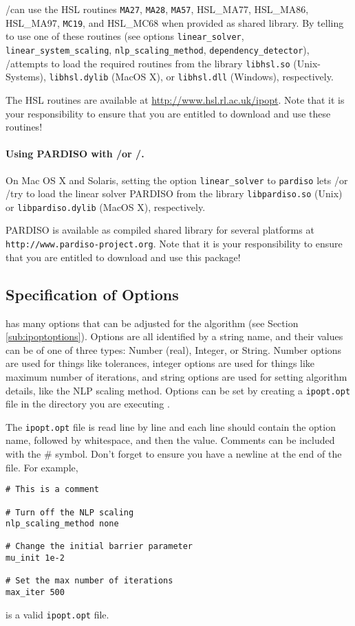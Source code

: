 \GAMS/\IPOPT can use the HSL routines \texttt{MA27}, \texttt{MA28}, \texttt{MA57}, \textsc{HSL\_MA77}, \textsc{HSL\_MA86}, \textsc{HSL\_MA97}, \texttt{MC19}, and \textsc{HSL\_MC68} when provided as shared library.
By telling \IPOPT to use one of these routines (see options \texttt{linear\_solver}, \texttt{linear\_system\_scaling}, \texttt{nlp\_scaling\_method}, \texttt{dependency\_detector}), \GAMS/\IPOPT attempts to load the required routines from the library \texttt{libhsl.so} (Unix-Systems), \texttt{libhsl.dylib} (MacOS X), or \texttt{libhsl.dll} (Windows), respectively.

The HSL routines are available at \url{http://www.hsl.rl.ac.uk/ipopt}.
Note that it is your responsibility to ensure that you are entitled to download and use these routines!

\paragraph{Using PARDISO with \GAMS/\IPOPT or \GAMS/\IPOPTH.}
On Mac OS X and Solaris, setting the option \texttt{linear\_solver} to \texttt{pardiso} lets \GAMS/\IPOPT or \GAMS/\IPOPTH try to load the linear solver PARDISO from the library \texttt{libpardiso.so} (Unix) or \texttt{libpardiso.dylib} (MacOS X), respectively.

PARDISO is available as compiled shared library for several platforms at \texttt{http://www.pardiso-project.org}.
Note that it is your responsibility to ensure that you are entitled to download and use this package!

\subsection{Specification of Options}
\label{sub:ipoptoptionspec}

\IPOPT has many options that can be adjusted for the algorithm (see Section \ref{sub:ipoptoptions}).
Options are all identified by a string name, and their values can be of one of three types: Number (real), Integer, or String.
Number options are used for things like tolerances, integer options are used for things like maximum number of iterations, and string options are used for setting algorithm details, like the NLP scaling method.
Options can be set by creating a \texttt{ipopt.opt} file in the directory you are executing \IPOPT.

The \texttt{ipopt.opt} file is read line by line and each line should contain the option name, followed by whitespace, and then the value.
Comments can be included with the \# symbol. Don't forget to ensure you have a newline at the end of the file. For example,
\begin{verbatim}
# This is a comment

# Turn off the NLP scaling
nlp_scaling_method none

# Change the initial barrier parameter
mu_init 1e-2

# Set the max number of iterations
max_iter 500
\end{verbatim}
is a valid \texttt{ipopt.opt} file.

